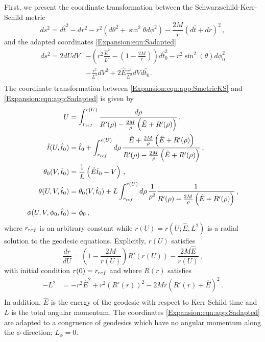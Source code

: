 	First, we present the coordinate transformation between the Schwarzschild-Kerr-Schild metric 
	\begin{equation}\label{Expansion:eqn:app:SmetricKS}
	ds^2 = d\hat{t}^2- dr^2-r^2 \left(d\theta^2 + \sin^2\theta d \phi^2\right) -\frac{2M}{r}(d\hat{t} + dr)^2  \, ,
	\end{equation}
	and the adapted coordinates \eqref{Expansion:eqn:Sadapted}
	\begin{equation}\label{Expansion:eqn:app:Sadapted}
	\begin{aligned}
	ds^2 =  
	2 dU dV&- \left(r^2 \frac{\hat{E}^2}{L^2}-\left(1-\frac{2M}{r}\right)\right)d\hat{t}_0^2 - r^2 \sin^2(\theta) d \phi_0^2  \\ &-\frac{r^2}{L^2} dV^2+2\hat{E} \frac{r^2}{L^2} dV d\hat{t}_0 \, .\\
	\end{aligned}
	\end{equation}
	The coordinate transformation between \eqref{Expansion:eqn:app:SmetricKS} and \eqref{Expansion:eqn:app:Sadapted} is given by \cite{Chawla:2024mse}
	\begin{equation}\label{Expansion:eqn:app:Schwarzschildadapted}
	\begin{aligned}
	U &= \int^{r(U)}_{r_{\textrm ref}} \frac{d\rho}{R'(\rho) -\frac{2M}{\rho} \left(\hat{E}+R'(\rho)\right)}   \, , \\ 
	\hat{t}(U,\hat{t}_0) &= \hat{t}_0 + \int^{r(U)}_{r_{\textrm ref}} d\rho \, \frac{\hat{E}+\frac{2M}{\rho} \left(\hat{E}+ R'(\rho)\right)}{R'(\rho) -\frac{2M}{\rho} \left(\hat{E}+R'(\rho)\right)} \, , \\
	\theta_0(V,\hat{t}_0) &= \frac{1}{L}\left(\hat{E}\hat{t}_0  - V\right) \, , \\
	\theta(U,V, \hat{t}_0) &= \theta_0(V,\hat{t}_0)+ L\int^{r(U)}_{r_{\textrm ref}} d\rho \, \frac{1}{\rho^2}\frac{1}{R'(\rho) -\frac{2M}{\rho} \left(\hat{E}+R'(\rho)\right)} \, ,\\
	\phi(U,V,\phi_0,\hat{t}_0) &= \phi_0  \, ,
	\end{aligned}
	\end{equation}
	where $r_{\textrm ref}$ is an arbitrary constant while $r(U) = r(U;\hat{E},L^2)$ is a radial solution to the geodesic equations. Explicitly, $r(U)$ satisfies
	\begin{equation}
	\frac{dr}{dU} = \left(1-\frac{2M}{r(U)}\right)R'(r(U)) - \frac{2M \hat{E}}{r(U)} \, , 
	\end{equation}
	with initial condition $r(0) = r_{\textrm ref}$ and where $R(r)$ satisfies
	\begin{equation}\label{Expansion:eqn:uschwarzschild}
	\begin{aligned}
	-L^2 &= -r^2 \hat{E}^2+r^2 \left(R'(r)\right)^2-2 M r \left(R'(r)+\hat{E}\right)^2 \, . \\
	\end{aligned}
	\end{equation}
	In addition, $\hat{E}$ is the energy of the geodesic with respect to Kerr-Schild time and $L$ is the total angular momentum. The coordinates \eqref{Expansion:eqn:app:Sadapted} are adapted to a congruence of geodesics which have no angular momentum along the $\phi$-direction; $L_{\phi} = 0$.
	
